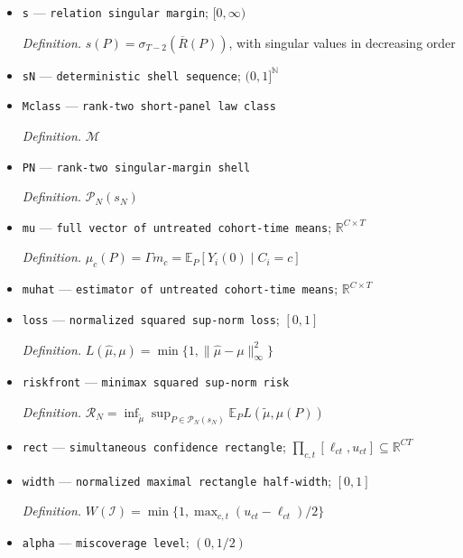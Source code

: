\documentclass{article}
\begin{document}
\begin{itemize}
  \par\smallskip\noindent\emph{Definition.} \(r_{1,2}(H_3)=\max\{|F|:F\subseteq E(H_3),\ |F'|\le |V(F')|-2\text{ for every }\varnothing\ne F'\subseteq F\}\)
  \item \texttt{s} --- \texttt{relation singular margin}; \([0,\infty)\)
  \par\smallskip\noindent\emph{Definition.} \(s(P)=\sigma_{T-2}(\overline R(P))\), with singular values in decreasing order
  \item \texttt{sN} --- \texttt{deterministic shell sequence}; \((0,1]^{\mathbb N}\)
  \item \texttt{Mclass} --- \texttt{rank-\allowbreak{}two short-\allowbreak{}panel law class}
  \par\smallskip\noindent\emph{Definition.} \(\mathcal M\)
  \item \texttt{PN} --- \texttt{rank-\allowbreak{}two singular-\allowbreak{}margin shell}
  \par\smallskip\noindent\emph{Definition.} \(\mathcal P_N(s_N)\)
  \item \texttt{mu} --- \texttt{full vector of untreated cohort-\allowbreak{}time means}; \(\mathbb R^{C\times T}\)
  \par\smallskip\noindent\emph{Definition.} \(\mu_c(P)=\Gamma m_c=\mathbb E_P[Y_i(0)\mid C_i=c]\)
  \item \texttt{muhat} --- \texttt{estimator of untreated cohort-\allowbreak{}time means}; \(\mathbb R^{C\times T}\)
  \item \texttt{loss} --- \texttt{normalized squared sup-\allowbreak{}norm loss}; \([0,1]\)
  \par\smallskip\noindent\emph{Definition.} \(L(\widehat\mu,\mu)=\min\{1,\|\widehat\mu-\mu\|_\infty^2\}\)
  \item \texttt{riskfront} --- \texttt{minimax squared sup-\allowbreak{}norm risk}
  \par\smallskip\noindent\emph{Definition.} \(\mathcal R_N=\inf_{\widetilde\mu}\sup_{P\in\mathcal P_N(s_N)}\mathbb E_PL(\widetilde\mu,\mu(P))\)
  \item \texttt{rect} --- \texttt{simultaneous confidence rectangle}; \(\prod_{c,t}[\ell_{ct},u_{ct}]\subseteq\mathbb R^{CT}\)
  \item \texttt{width} --- \texttt{normalized maximal rectangle half-\allowbreak{}width}; \([0,1]\)
  \par\smallskip\noindent\emph{Definition.} \(W(\mathcal I)=\min\{1,\max_{c,t}(u_{ct}-\ell_{ct})/2\}\)
  \item \texttt{alpha} --- \texttt{miscoverage level}; \((0,1/2)\)

\end{itemize}
\end{document}
